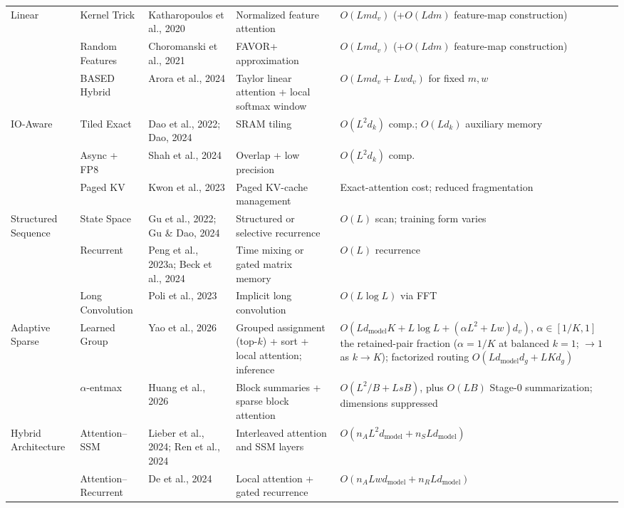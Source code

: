 \documentclass[10pt,twocolumn]{article}
\begin{document}
\begin{table}[!tbp]
\begin{tabular}{p{2.3cm}p{2.2cm}p{2.2cm}p{2.8cm}p{2.0cm}}
\midrule
\multirow{3}{2.3cm}{Linear} & Kernel Trick & Katharopoulos et al., 2020 & Normalized feature attention & $O(Lmd_v)$ (+$O(Ldm)$ feature-map construction) \\
 & Random Features & Choromanski et al., 2021 & FAVOR+ approximation & $O(Lmd_v)$ (+$O(Ldm)$ feature-map construction) \\
 & BASED Hybrid & Arora et al., 2024 & Taylor linear attention + local softmax window & $O(Lmd_v+Lwd_v)$ for fixed $m,w$ \\
\midrule
\multirow{3}{2.3cm}{IO-Aware} & Tiled Exact & Dao et al., 2022; Dao, 2024 & SRAM tiling & $O(L^2d_k)$ comp.; $O(Ld_k)$ auxiliary memory \\
 & Async + FP8 & Shah et al., 2024 & Overlap + low precision & $O(L^2d_k)$ comp. \\
 & Paged KV & Kwon et al., 2023 & Paged KV-cache management & Exact-attention cost; reduced fragmentation \\
\midrule
\multirow{3}{2.3cm}{Structured Sequence} & State Space & Gu et al., 2022; Gu \& Dao, 2024 & Structured or selective recurrence & $O(L)$ scan; training form varies \\
 & Recurrent & Peng et al., 2023a; Beck et al., 2024 & Time mixing or gated matrix memory & $O(L)$ recurrence \\
 & Long Convolution & Poli et al., 2023 & Implicit long convolution & $O(L\log L)$ via FFT \\
\midrule
\multirow{2}{2.3cm}{Adaptive Sparse} & Learned Group & Yao et al., 2026 & Grouped assignment (top-$k$) + sort + local attention; inference & $O(Ld_{\mathrm{model}}K+L\log L+(\alpha L^2+Lw)d_v)$, $\alpha\in[1/K,1]$ the retained-pair fraction ($\alpha{=}1/K$ at balanced $k{=}1$; $\rightarrow 1$ as $k\rightarrow K$); factorized routing $O(Ld_{\mathrm{model}}d_g+LKd_g)$ \\
 & $\alpha$-entmax & Huang et al., 2026 & Block summaries + sparse block attention & $O(L^2/B+LsB)$, plus $O(LB)$ Stage-0 summarization; dimensions suppressed \\
\midrule
\multirow{2}{2.3cm}{Hybrid Architecture} & Attention--SSM & Lieber et al., 2024; Ren et al., 2024 & Interleaved attention and SSM layers & $O(n_A L^2d_{\mathrm{model}}+n_S Ld_{\mathrm{model}})$ \\
 & Attention--Recurrent & De et al., 2024 & Local attention + gated recurrence & $O(n_A Lwd_{\mathrm{model}}+n_R Ld_{\mathrm{model}})$ \\
\bottomrule
\end{tabular}
\end{table}
\end{document}

